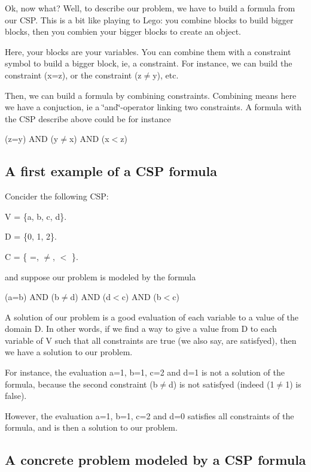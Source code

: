 Ok, now what? Well, to describe our problem, we have to build a formula from our C\-S\-P. This is a bit like playing to Lego\-: you combine blocks to build bigger blocks, then you combien your bigger blocks to create an object.

Here, your blocks are your variables. You can combine them with a constraint symbol to build a bigger block, ie, a constraint. For instance, we can build the constraint (x=z), or the constraint (z{$\ne$}y), etc.

Then, we can build a formula by combining constraints. Combining means here we have a conjuction, ie a \char`\"{}and\char`\"{}-\/operator linking two constraints. A formula with the C\-S\-P describe above could be for instance

(z=y) A\-N\-D (y{$\ne$}x) A\-N\-D (x$<$z)

\subsection*{A first example of a C\-S\-P formula }

Concider the following C\-S\-P\-:


\begin{DoxyItemize}
\item V = \{a, b, c, d\}.
\item D = \{0, 1, 2\}.
\item C = \{ =, {$\ne$}, $<$ \}.
\end{DoxyItemize}

and suppose our problem is modeled by the formula

(a=b) A\-N\-D (b{$\ne$}d) A\-N\-D (d$<$c) A\-N\-D (b$<$c)

A solution of our problem is a good evaluation of each variable to a value of the domain D. In other words, if we find a way to give a value from D to each variable of V such that all constraints are true (we also say, are satisfyed), then we have a solution to our problem.

For instance, the evaluation a=1, b=1, c=2 and d=1 is not a solution of the formula, because the second constraint (b{$\ne$}d) is not satisfyed (indeed (1{$\ne$}1) is false).

However, the evaluation a=1, b=1, c=2 and d=0 satisfies all constraints of the formula, and is then a solution to our problem.

\subsection*{A concrete problem modeled by a C\-S\-P formula }

